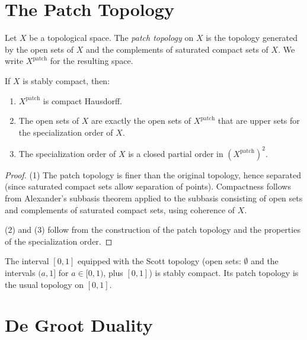 \section{The Patch Topology}

\begin{definition}
Let $X$ be a topological space. The \emph{patch topology} on $X$ is the topology generated
by the open sets of $X$ and the complements of saturated compact sets of $X$. We write
$X^{\mathrm{patch}}$ for the resulting space.
\end{definition}

\begin{theorem}
\label{thm:patch}
If $X$ is stably compact, then:
\begin{enumerate}
  \item $X^{\mathrm{patch}}$ is compact Hausdorff.
  \item The open sets of $X$ are exactly the open sets of $X^{\mathrm{patch}}$ that are
    upper sets for the specialization order of $X$.
  \item The specialization order of $X$ is a closed partial order in
    $(X^{\mathrm{patch}})^2$.
\end{enumerate}
\end{theorem}

\begin{proof}
(1) The patch topology is finer than the original topology, hence separated (since
saturated compact sets allow separation of points). Compactness follows from Alexander's
subbasis theorem applied to the subbasis consisting of open sets and complements of
saturated compact sets, using coherence of $X$.

(2) and (3) follow from the construction of the patch topology and the properties of the
specialization order.
\end{proof}

\begin{example}
The interval $[0,1]$ equipped with the Scott topology (open sets: $\emptyset$ and the
intervals $(a, 1]$ for $a \in [0,1)$, plus $[0,1]$) is stably compact. Its patch topology
is the usual topology on $[0,1]$.
\end{example}

\section{De Groot Duality}

